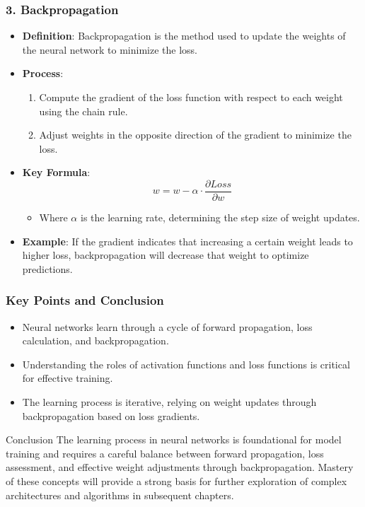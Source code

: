 \documentclass[aspectratio=169]{beamer}
\begin{document}
\begin{frame}[fragile]
    \frametitle{3. Backpropagation}

    \begin{itemize}
        \item \textbf{Definition}: Backpropagation is the method used to update the weights of the neural network to minimize the loss.
        
        \item \textbf{Process}:
        \begin{enumerate}
            \item Compute the gradient of the loss function with respect to each weight using the chain rule.
            \item Adjust weights in the opposite direction of the gradient to minimize the loss.
        \end{enumerate}
        
        \item \textbf{Key Formula}:
        \begin{equation}
        w = w - \alpha \cdot \frac{\partial Loss}{\partial w}
        \end{equation}
        \begin{itemize}
            \item Where \( \alpha \) is the learning rate, determining the step size of weight updates.
        \end{itemize}
        
        \item \textbf{Example}: If the gradient indicates that increasing a certain weight leads to higher loss, backpropagation will decrease that weight to optimize predictions.
    \end{itemize}
\end{frame}

\begin{frame}[fragile]
    \frametitle{Key Points and Conclusion}

    \begin{itemize}
        \item Neural networks learn through a cycle of forward propagation, loss calculation, and backpropagation.
        \item Understanding the roles of activation functions and loss functions is critical for effective training.
        \item The learning process is iterative, relying on weight updates through backpropagation based on loss gradients.
    \end{itemize}

    \begin{block}{Conclusion}
        The learning process in neural networks is foundational for model training and requires a careful balance between forward propagation, loss assessment, and effective weight adjustments through backpropagation. Mastery of these concepts will provide a strong basis for further exploration of complex architectures and algorithms in subsequent chapters.
    \end{block}
\end{frame}
\end{document}

